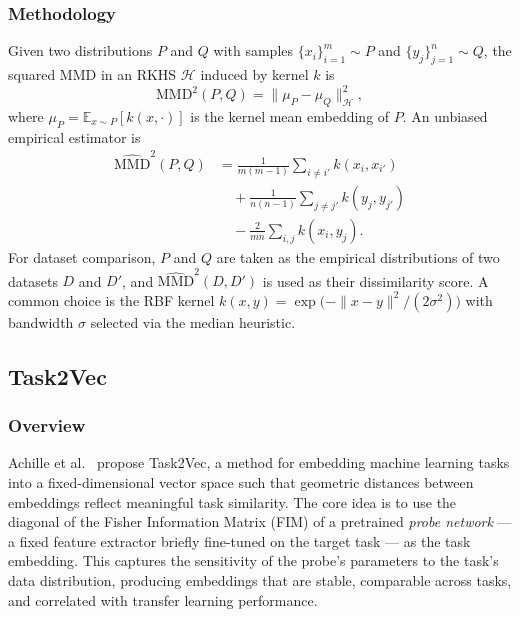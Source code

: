 \documentclass[peerreview]{IEEEtran}
\begin{document}
\subsubsection*{Methodology}
Given two distributions $P$ and $Q$ with samples
$\{x_i\}_{i=1}^{m} \sim P$ and $\{y_j\}_{j=1}^{n} \sim Q$, the
squared MMD in an RKHS $\mathcal{H}$ induced by kernel $k$ is
\begin{equation}
    \mathrm{MMD}^2(P, Q)
    = \bigl\|\mu_P - \mu_Q\bigr\|_{\mathcal{H}}^{2},
\end{equation}
where $\mu_P = \mathbb{E}_{x \sim P}[k(x, \cdot)]$ is the kernel mean
embedding of $P$. An unbiased empirical estimator is
\begin{equation}
\begin{aligned}
    \widehat{\mathrm{MMD}}^2(P, Q)
    &= \frac{1}{m(m-1)} \sum_{i \neq i'} k(x_i, x_{i'}) \\
    &\quad + \frac{1}{n(n-1)} \sum_{j \neq j'} k(y_j, y_{j'}) \\
    &\quad - \frac{2}{mn} \sum_{i, j} k(x_i, y_j).
\end{aligned}
\end{equation}
For dataset comparison, $P$ and $Q$ are taken as the empirical
distributions of two datasets $D$ and $D'$, and
$\widehat{\mathrm{MMD}}^2(D, D')$ is used as their dissimilarity
score. A common choice is the RBF kernel
$k(x, y) = \exp\bigl(-\|x - y\|^{2} / (2\sigma^{2})\bigr)$ with
bandwidth $\sigma$ selected via the median heuristic.

\subsection{Task2Vec}

\subsubsection*{Overview}
Achille et al.~\cite{achille2019task2vec} propose Task2Vec, a method
for embedding machine learning tasks into a fixed-dimensional vector
space such that geometric distances between embeddings reflect
meaningful task similarity. The core idea is to use the diagonal of
the Fisher Information Matrix (FIM) of a pretrained \emph{probe
network} --- a fixed feature extractor briefly fine-tuned on the
target task --- as the task embedding. This captures the sensitivity
of the probe's parameters to the task's data distribution, producing
embeddings that are stable, comparable across tasks, and correlated
with transfer learning performance.
\end{document}
